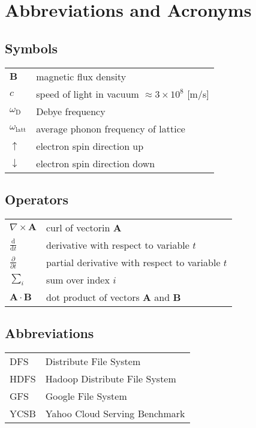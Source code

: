 \chapter*{Abbreviations and Acronyms}

\section*{Symbols}

\begin{tabular}{ll}
$\mathbf{B}$  & magnetic flux density  \\
$c$              & speed of light in vacuum $\approx 3\times10^8$ [m/s]\\
$\omega_{\mathrm{D}}$    & Debye frequency \\
$\omega_{\mathrm{latt}}$ & average phonon frequency of lattice \\
$\uparrow$       & electron spin direction up\\
$\downarrow$     & electron spin direction down
\end{tabular}

\section*{Operators}

\begin{tabular}{ll}
$\nabla \times \mathbf{A}$              & curl of vectorin $\mathbf{A}$\\
$\displaystyle\frac{\mbox{d}}{\mbox{d} t}$ & derivative with respect to 
variable $t$\\[3mm]
$\displaystyle\frac{\partial}{\partial t}$  & partial derivative with respect 
to variable $t$ \\[3mm]
$\sum_i $                       & sum over index $i$\\
$\mathbf{A} \cdot \mathbf{B}$    & dot product of vectors $\mathbf{A}$ and 
$\mathbf{B}$
\end{tabular}

\section*{Abbreviations}

\begin{tabular}{ll}
DFS	   	& Distribute File System \\
HDFS         & Hadoop Distribute File System \\
GFS		 & Google File System \\
YCSB	 & Yahoo Cloud Serving Benchmark
\end{tabular}
\clearpage
